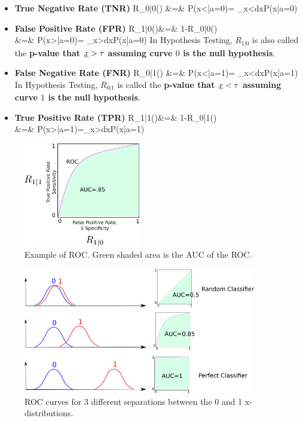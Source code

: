 \begin{itemize}


\item{\color{blue}\bf True Negative Rate (TNR)}
\beqa
\color{blue}
R_{0|0}(\tau)
&=&
 P(x<\tau|a=0)= \int_{x<\tau}dx\;P(x|a=0)
\eeqa

\item {\color{blue}\bf False Positive Rate (FPR)}
\beqa
\color{blue}
R_{1|0}(\tau)&=&
1-R_{0|0}(\tau)
\\
&=&
P(x>\tau|a=0)= \int_{x>\tau}dx\;P(x|a=0)
\eeqa
In Hypothesis Testing,
$R_{1|0}$ is also called the {\bf p-value that ${\underline{x}}>\tau$
assuming curve $0$ is the
null hypothesis}.

\item {\color{red}\bf False Negative Rate (FNR)}
\beqa
\color{red}
R_{0|1}(\tau)
&=& P(x<\tau|a=1)= \int_{x<\tau}dx\;P(x|a=1)
\eeqa
In Hypothesis Testing,
$R_{0|1}$ is called the 
{\bf p-value that ${\underline{x}}<\tau$
assuming curve $1$ is the
null hypothesis}.

\item{\color{red}\bf True Positive  Rate (TPR)}
\beqa
\color{red}
R_{1|1}(\tau)&=& 
1-R_{0|1}(\tau)
\\
&=&
P(x>\tau|a=1)=\int_{x>\tau}dx\;P(x|a=1)
\eeqa


\end{itemize}

\begin{figure}[h!]
\centering
\includegraphics[width=2in]
{roc/roc-auc.png}
\caption{Example of ROC.
Green shaded
 area is the AUC of the ROC.} 
\label{fig-roc-auc}
\end{figure}

\begin{figure}[h!]
\centering
\includegraphics[width=4in]
{roc/roc-panels.png}
\caption{
ROC curves for
3 different separations
between the 0 and 1 
x-distributions.} 
\label{fig-roc-panels}
\end{figure}



